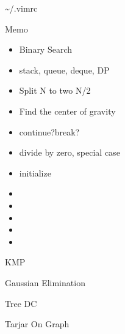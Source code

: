 \documentclass[12pt]{article}
\begin{document}
\begin{multicols}{2}
\begingroup
\def\addvspace#1{}
  \tableofcontents
\endgroup
\end{multicols}

\begin{section}{\textasciitilde/.vimrc}
  \lstset{numbers=none}
  
\end{section}

\begin{section}{Memo}
  \begin{multicols}{3}
    \begin{itemize}
      \item Binary Search
      \item stack, queue, deque, DP
      \item Split N to two N/2
      \item Find the center of gravity
      \item continue?break?
      \item divide by zero, special case
      \item initialize
      \item
      \item
      \item
      \item
      \item
    \end{itemize}
  \end{multicols}
\end{section}

\lstset{
  language=C++,
}

\begin{section}{KMP}
  
\end{section}

\begin{section}{Gaussian Elimination}
  \begin{multicols}{2}
    
  \end{multicols}
\end{section}

\begin{section}{Tree DC}
  \begin{multicols}{2}
    
  \end{multicols}
\end{section}

\begin{section}{Tarjar On Graph}
  
\end{section}
\end{document}
